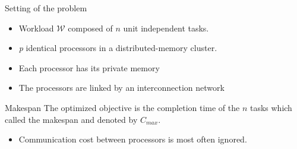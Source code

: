 \documentclass{beamer}
\begin{document}







\begin{frame}{Setting of the problem}
    \begin{itemize}
        \item { Workload $\mathcal{W}$ composed of $n$ unit independent tasks.}
        \item { \emph{p} identical processors in a distributed-memory cluster.  }                                     
        \item { Each processor has its private memory}
        \item { The processors are linked by an interconnection network}                                     
    \end{itemize}
        
        \begin{block}{Makespan}
            The optimized objective is the completion time of the $n$ tasks which called the \alert{makespan} and denoted by \alert{$C_{max}$}.
        \end{block}
        
     \begin{itemize}
         \item \alert{ Communication cost between processors is most often ignored. }                                     
     \end{itemize}

\end{frame}
\end{document}
